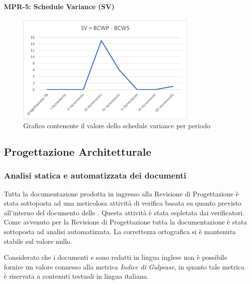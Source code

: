 \paragraph{MPR-5: Schedule Variance (SV)}\label{_SV}
\begin{figure}[!htb]
    \centering
    \includegraphics[width=0.8\textwidth]{res/images/metriche_costi/SV.png}
    \caption{Grafico contenente il valore dello schedule variance per periodo}
\end{figure} 


\newpage
\subsection{Progettazione Architetturale} 

\subsubsection{Analisi statica e automatizzata dei documenti}\label{resocontoProgettazioneArchitetturale}
Tutta la documentazione prodotta in ingresso alla Revisione di Progettazione è stata sottoposta ad una meticolosa attività di verifica
basata su quanto previsto all'interno del documento delle .
Questa attività è stata espletata dai verificatori.
Come avvenuto per la Revisione di Progettazione tutta la documentazione è stata sottoposta ad analisi automatizzata.
La correttezza ortografica si è mantenuta stabile sul valore nullo.

Considerato che i documenti  e   sono redatti in lingua inglese
non è possibile fornire un valore connesso alla metrica \textit{Indice di Gulpease}, in quanto tale metrica è riservata a contenuti 
testuali in lingua italiana.

